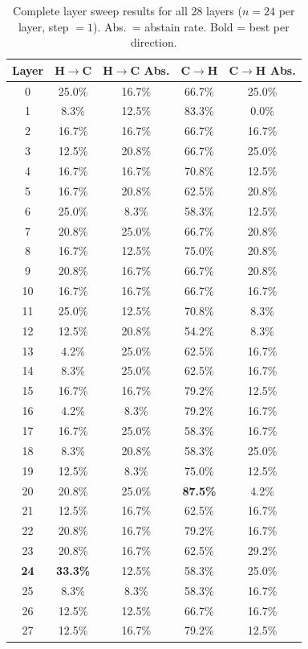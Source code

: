 \documentclass[11pt,a4paper]{article}
\begin{document}
\begin{table}[H]
\centering
\scriptsize
\caption{Complete layer sweep results for all 28 layers ($n = 24$ per layer, step $= 1$). Abs.\ = abstain rate. Bold = best per direction.}
\label{tab:layer_sweep_full}
\begin{tabular}{ccccc}
\toprule
\textbf{Layer} & \textbf{H$\to$C} & \textbf{H$\to$C Abs.} & \textbf{C$\to$H} & \textbf{C$\to$H Abs.} \\
\midrule
0 & 25.0\% & 16.7\% & 66.7\% & 25.0\% \\
1 & 8.3\% & 12.5\% & 83.3\% & 0.0\% \\
2 & 16.7\% & 16.7\% & 66.7\% & 16.7\% \\
3 & 12.5\% & 20.8\% & 66.7\% & 25.0\% \\
4 & 16.7\% & 16.7\% & 70.8\% & 12.5\% \\
5 & 16.7\% & 20.8\% & 62.5\% & 20.8\% \\
6 & 25.0\% & 8.3\% & 58.3\% & 12.5\% \\
7 & 20.8\% & 25.0\% & 66.7\% & 20.8\% \\
8 & 16.7\% & 12.5\% & 75.0\% & 20.8\% \\
9 & 20.8\% & 16.7\% & 66.7\% & 20.8\% \\
10 & 16.7\% & 16.7\% & 66.7\% & 16.7\% \\
11 & 25.0\% & 12.5\% & 70.8\% & 8.3\% \\
12 & 12.5\% & 20.8\% & 54.2\% & 8.3\% \\
13 & 4.2\% & 25.0\% & 62.5\% & 16.7\% \\
14 & 8.3\% & 25.0\% & 62.5\% & 16.7\% \\
15 & 16.7\% & 16.7\% & 79.2\% & 12.5\% \\
16 & 4.2\% & 8.3\% & 79.2\% & 16.7\% \\
17 & 16.7\% & 25.0\% & 58.3\% & 16.7\% \\
18 & 8.3\% & 20.8\% & 58.3\% & 25.0\% \\
19 & 12.5\% & 8.3\% & 75.0\% & 12.5\% \\
20 & 20.8\% & 25.0\% & \textbf{87.5\%} & 4.2\% \\
21 & 12.5\% & 16.7\% & 62.5\% & 16.7\% \\
22 & 20.8\% & 16.7\% & 79.2\% & 16.7\% \\
23 & 20.8\% & 16.7\% & 62.5\% & 29.2\% \\
\textbf{24} & \textbf{33.3\%} & 12.5\% & 58.3\% & 25.0\% \\
25 & 8.3\% & 8.3\% & 58.3\% & 16.7\% \\
26 & 12.5\% & 12.5\% & 66.7\% & 16.7\% \\
27 & 12.5\% & 16.7\% & 79.2\% & 12.5\% \\
\bottomrule
\end{tabular}
\end{table}
\end{document}
